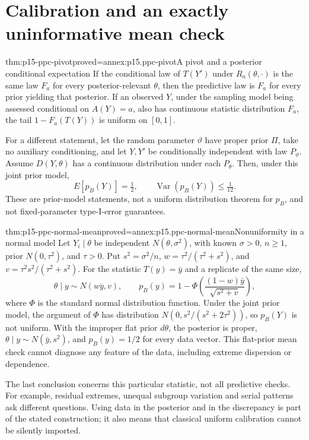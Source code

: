 \section{Calibration and an exactly uninformative mean check}
\label{sec:p15-ppc-calibration}

\begin{hbtheorem}{thm:p15-ppc-pivot}{proved=annex:p15.ppc-pivot}{A pivot and a posterior conditional expectation}
If the conditional law of \(T(Y')\) under \(R_a(\theta,\cdot)\) is
the same law \(F_a\) for every posterior-relevant \(\theta\), then the
predictive law is \(F_a\) for every prior yielding that posterior.
If an observed \(Y\), under the sampling model being assessed conditional
on \(A(Y)=a\), also has continuous statistic distribution \(F_a\),
the tail \(1-F_a(T(Y))\) is uniform on \([0,1]\).

For a different statement, let the random parameter \(\vartheta\) have
proper prior \(\Pi\), take no auxiliary conditioning, and let
\(Y,Y'\) be conditionally independent with law \(P_\vartheta\). Assume
\(D(Y,\theta)\) has a continuous distribution under each \(P_\theta\).
Then, under this joint prior model,
\[
 E[p_B(Y)]=\tfrac12,\qquad
 \operatorname{Var}(p_B(Y))\leq\tfrac1{12}.
\]
These are prior-model statements, not a uniform distribution theorem for
\(p_B\), and not fixed-parameter type-I-error guarantees.
\end{hbtheorem}

\begin{hbtheorem}{thm:p15-ppc-normal-mean}{proved=annex:p15.ppc-normal-mean}{Nonuniformity in a normal model}
Let \(Y_i\mid\theta\) be independent \(N(\theta,\sigma^2)\), with
known \(\sigma>0\), \(n\geq1\), prior \(N(0,\tau^2)\), and
\(\tau>0\). Put \(s^2=\sigma^2/n\),
\(w=\tau^2/(\tau^2+s^2)\), and \(v=\tau^2s^2/(\tau^2+s^2)\).
For the statistic \(T(y)=\bar y\) and a replicate of the same size,
\[
 \theta\mid y\sim N(w\bar y,v),\qquad
 p_B(y)=1-\Phi\left(\frac{(1-w)\bar y}{\sqrt{s^2+v}}\right),
\]
where \(\Phi\) is the standard normal distribution function.
Under the joint prior model, the argument of \(\Phi\) has distribution
\(N(0,s^2/(s^2+2\tau^2))\), so \(p_B(Y)\) is not uniform.
With the improper flat prior \(d\theta\), the posterior is proper,
\(\theta\mid y\sim N(\bar y,s^2)\), and \(p_B(y)=1/2\) for every
data vector. This flat-prior mean check cannot diagnose any feature of
the data, including extreme dispersion or dependence.
\end{hbtheorem}

The last conclusion concerns this particular statistic, not all predictive
checks. For example, residual extremes, unequal subgroup variation and serial
patterns ask different questions. Using data in the posterior and in the
discrepancy is part of the stated construction; it also means that classical
uniform calibration cannot be silently imported.

